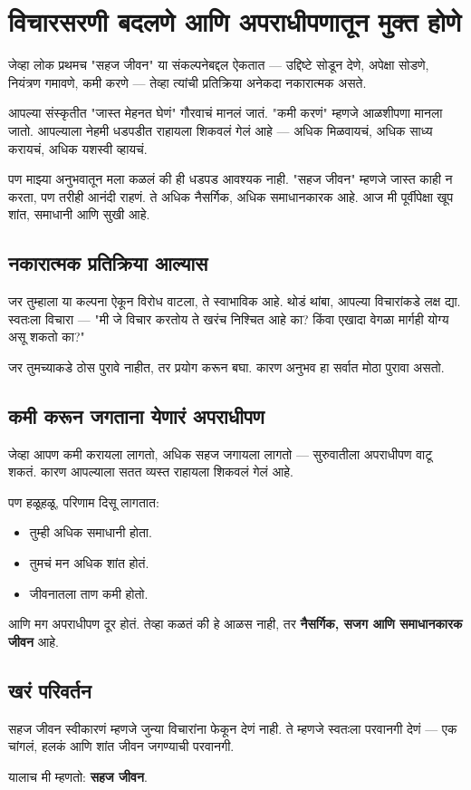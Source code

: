 \chapter{विचारसरणी बदलणे आणि अपराधीपणातून मुक्त होणे}

जेव्हा लोक प्रथमच "सहज जीवन" या संकल्पनेबद्दल ऐकतात —  
उद्दिष्टे सोडून देणे, अपेक्षा सोडणे, नियंत्रण गमावणे, कमी करणे —  
तेव्हा त्यांची प्रतिक्रिया अनेकदा नकारात्मक असते.  

आपल्या संस्कृतीत "जास्त मेहनत घेणं" गौरवाचं मानलं जातं.  
"कमी करणं" म्हणजे आळशीपणा मानला जातो.  
आपल्याला नेहमी धडपडीत राहायला शिकवलं गेलं आहे —  
अधिक मिळवायचं, अधिक साध्य करायचं, अधिक यशस्वी व्हायचं.  

पण माझ्या अनुभवातून मला कळलं की ही धडपड आवश्यक नाही.  
"सहज जीवन" म्हणजे जास्त काही न करता, पण तरीही आनंदी राहणं.  
ते अधिक नैसर्गिक, अधिक समाधानकारक आहे.  
आज मी पूर्वीपेक्षा खूप शांत, समाधानी आणि सुखी आहे.  



\section*{नकारात्मक प्रतिक्रिया आल्यास}

जर तुम्हाला या कल्पना ऐकून विरोध वाटला, ते स्वाभाविक आहे.  
थोडं थांबा, आपल्या विचारांकडे लक्ष द्या.  
स्वतःला विचारा —  
"मी जे विचार करतोय ते खरंच निश्चित आहे का?  
किंवा एखादा वेगळा मार्गही योग्य असू शकतो का?"  

जर तुमच्याकडे ठोस पुरावे नाहीत, तर प्रयोग करून बघा.  
कारण अनुभव हा सर्वात मोठा पुरावा असतो.  



\section*{कमी करून जगताना येणारं अपराधीपण}

जेव्हा आपण कमी करायला लागतो, अधिक सहज जगायला लागतो —  
सुरुवातीला अपराधीपण वाटू शकतं.  
कारण आपल्याला सतत व्यस्त राहायला शिकवलं गेलं आहे.  

पण हळूहळू, परिणाम दिसू लागतात:  
\begin{itemize}
  \item तुम्ही अधिक समाधानी होता.  
  \item तुमचं मन अधिक शांत होतं.  
  \item जीवनातला ताण कमी होतो.  
\end{itemize}

आणि मग अपराधीपण दूर होतं.  
तेव्हा कळतं की हे आळस नाही, तर \textbf{नैसर्गिक, सजग आणि समाधानकारक जीवन} आहे.  



\section*{खरं परिवर्तन}

सहज जीवन स्वीकारणं म्हणजे जुन्या विचारांना फेकून देणं नाही.  
ते म्हणजे स्वतःला परवानगी देणं —  
एक चांगलं, हलकं आणि शांत जीवन जगण्याची परवानगी.  

यालाच मी म्हणतो: \textbf{सहज जीवन}.  
